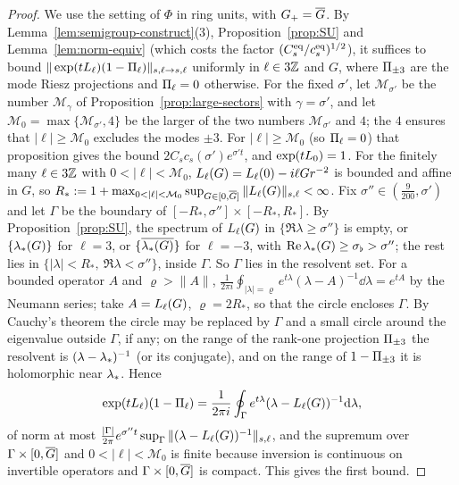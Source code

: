 \begin{proof}
We use the setting of $\Phi$ in ring units, with $G_+=\overline{G}$. By
Lemma~\ref{lem:semigroup-construct}(3), Proposition~\ref{prop:SU} and
Lemma~\ref{lem:norm-equiv} (which costs the factor
$(C^{\rm eq}_s/c^{\rm eq}_s)^{1/2}$), it suffices to bound
$\|\exp(tL_{\ell})(1-\Pi_\ell)\|_{s,\ell\to s,\ell}$ uniformly in $\ell\in3\mathbb{Z}$ and
$G$, where $\Pi_{\pm3}$ are the mode Riesz projections and $\Pi_\ell=0$
otherwise. For the fixed $\sigma'$, let $\mathcal M_{\sigma'}$ be the number
$\mathcal M_\gamma$ of Proposition~\ref{prop:large-sectors} with $\gamma=\sigma'$, and let
$\mathcal M_0=\max\{\mathcal M_{\sigma'},4\}$ be the larger of the two numbers
$\mathcal M_{\sigma'}$ and $4$; the $4$ ensures that $|\ell|\ge\mathcal M_0$ excludes the
modes $\pm3$. For $|\ell|\ge\mathcal M_0$ (so $\Pi_\ell=0$) that
proposition gives the bound $2C_sc_s(\sigma')e^{\sigma't}$, and
$\exp(tL_{0})=1$. For the finitely many $\ell\in3\mathbb{Z}$ with $0<|\ell|<\mathcal M_0$,
$L_{\ell}(G)=L_{\ell}(0)-i\ell Gr^{-2}$ is bounded and affine in $G$, so
$R_*:=1+\max_{0<|\ell|<\mathcal M_0}\sup_{G\in[0,\Gone]}\|\Lsec{\ell}(G)\|_{s,\ell}<\infty$. Fix
$\sigma''\in(\frac9{200},\sigma')$ and let $\Gamma$ be the boundary of
$[-R_*,\sigma'']\times[-R_*,R_*]$. By Proposition~\ref{prop:SU}, the spectrum of
$L_{\ell}(G)$ in $\{\Re\lambda\ge\sigma''\}$ is empty, or $\{\lambda_*(G)\}$ for
$\ell=3$, or $\{\overline{\lambda_*(G)}\}$ for $\ell=-3$, with
$\Re\lambda_*(G)\ge\sigma_\flat>\sigma''$; the rest lies in
$\{|\lambda|<R_*,\ \Re\lambda<\sigma''\}$, inside $\Gamma$. So $\Gamma$ lies in the
resolvent set. For a bounded operator $A$ and $\varrho>\|A\|$,
$\frac1{2\pi i}\oint_{|\lambda|=\varrho}e^{t\lambda}(\lambda-A)^{-1}\dd\lambda=e^{tA}$ by
the Neumann series; take $A=L_{\ell}(G)$, $\varrho=2R_*$, so that the circle encloses $\Gamma$. By Cauchy's theorem the
circle may be replaced by $\Gamma$ and a small circle around the eigenvalue
outside $\Gamma$, if any; on the range of the rank-one projection $\Pi_{\pm3}$
the resolvent is $(\lambda-\lambda_*)^{-1}$ (or its conjugate), and on the range of
$1-\Pi_{\pm3}$ it is holomorphic near $\lambda_*$. Hence
\[
\exp(tL_{\ell})(1-\Pi_\ell)=\frac1{2\pi i}\oint_\Gamma e^{t\lambda}(\lambda-L_{\ell}(G))^{-1}\dd\lambda,
\]
of norm at most $\frac{|\Gamma|}{2\pi}e^{\sigma''t}\sup_{\Gamma}\|(\lambda-L_{\ell}(G))^{-1}\|_{s,\ell}$,
and the supremum over $\Gamma\times[0,\overline{G}]$ and $0<|\ell|<\mathcal M_0$ is finite because
inversion is continuous on invertible operators and $\Gamma\times[0,\overline{G}]$ is compact. This gives the first bound.


\end{proof}
